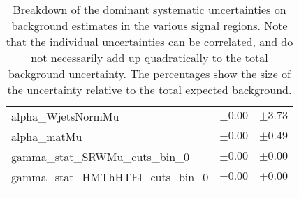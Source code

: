 \begin{table}
\begin{center}
\begin{tabular*}{\textwidth}{@{\extracolsep{\fill}}lcc}
alpha\_WjetsNormMu         & $\pm 0.00$          & $\pm 3.73$       \\
alpha\_matMu         & $\pm 0.00$          & $\pm 0.49$       \\
gamma\_stat\_SRWMu\_cuts\_bin\_0         & $\pm 0.00$          & $\pm 0.00$       \\
gamma\_stat\_HMThHTEl\_cuts\_bin\_0         & $\pm 0.00$          & $\pm 0.00$       \\
\noalign{\smallskip}\hline\noalign{\smallskip}
\end{tabular*}
\end{center}
\caption[Breakdown of uncertainty on background estimates]{
Breakdown of the dominant systematic uncertainties on background estimates in the various signal regions.
Note that the individual uncertainties can be correlated, and do not necessarily add up quadratically to 
the total background uncertainty. The percentages show the size of the uncertainty relative to the total expected background.
\label{table.results.bkgestimate.uncertainties.HMEThHTEl_HMEThHTMu}}
\end{table}
%